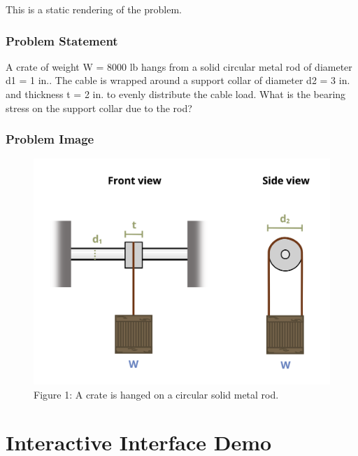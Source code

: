 \documentclass[
  letterpaper,
  DIV=11,
  numbers=noendperiod]{scrreprt}
\begin{document}
This is a static rendering of the problem.

\section*{Problem Statement}\label{problem-statement-9}


A crate of weight W = 8000 lb hangs from a solid circular metal rod of
diameter d1 = 1 in.. The cable is wrapped around a support collar of
diameter d2 = 3 in. and thickness t = 2 in. to evenly distribute the
cable load. What is the bearing stress on the support collar due to the
rod?

\section*{Problem Image}\label{problem-image-19}


\begin{figure}[H]

{\centering \includegraphics{images/166.png}

}

\caption{Figure 1: A crate is hanged on a circular solid metal rod.}

\end{figure}%

\part{Interactive Interface Demo}
\end{document}
